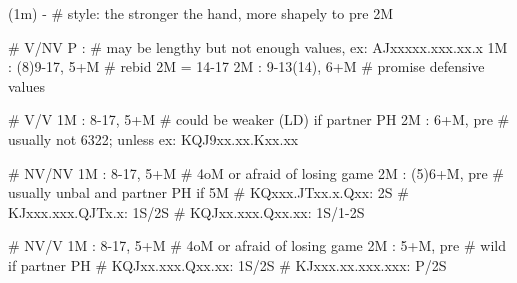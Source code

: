 (1m) -
# style: the stronger the hand, more shapely to pre 2M

# V/NV 
P  : # may be lengthy but not enough values, ex: AJxxxxx.xxx.xx.x
1M : (8)9-17, 5+M  # rebid 2M = 14-17
2M : 9-13(14), 6+M  # promise defensive values

# V/V
1M : 8-17, 5+M  # could be weaker (LD) if partner PH
2M : 6+M, pre  # usually not 6322; unless ex: KQJ9xx.xx.Kxx.xx

# NV/NV
1M : 8-17, 5+M  # 4oM or afraid of losing game
2M : (5)6+M, pre  # usually unbal and partner PH if 5M
# KQxxx.JTxx.x.Qxx: 2S
# KJxxx.xxx.QJTx.x: 1S/2S
# KQJxx.xxx.Qxx.xx: 1S/1-2S

# NV/V 
1M : 8-17, 5+M  # 4oM or afraid of losing game
2M : 5+M, pre  # wild if partner PH 
# KQJxx.xxx.Qxx.xx: 1S/2S
# KJxxx.xx.xxx.xxx: P/2S